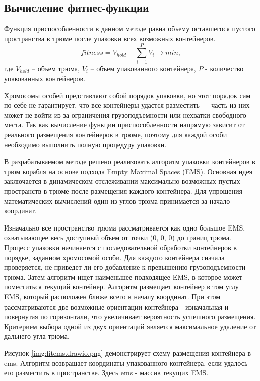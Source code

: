 \subsection{Вычисление фитнес-функции}
Функция приспособленности в данном методе равна объему оставшегося пустого пространства в трюме после упаковки всех возможных контейнеров.
    \begin{equation}
	\label{formula:req_fitness}
    fitness = V_{hold} - \sum_{i=1}^P V_{i} \to min,
    \end{equation}
где $V_{hold}$ – объем трюма, $V_{i}$ – объем упакованного контейнера, $P$ - количество упакованных контейнеров. 

Хромосомы особей представляют собой порядок упаковки, но этот порядок сам по себе не гарантирует, что все контейнеры удастся разместить — часть из них может не войти из-за ограничения грузоподъемности или нехватки свободного места. Так как вычисление функции приспособленности напрямую зависит от реального размещения контейнеров в трюме, поэтому для каждой особи необходимо выполнить полную процедуру упаковки.

В разрабатываемом методе решено реализовать алгоритм упаковки контейнеров в трюм корабля на основе подхода Empty Maximal Spaces (EMS). Основная идея заключается в динамическом отслеживании максимально возможных пустых пространств в трюме после размещения каждого контейнера. Для упрощения математических вычислений один из углов трюма принимается за начало координат.

Изначально все пространство трюма рассматривается как одно большое EMS, охватывающее весь доступный объем от точки (0, 0, 0) до границ трюма.
Процесс упаковки начинается с последовательной обработки контейнеров в порядке, заданном хромосомой особи. Для каждого контейнера сначала проверяется, не приведет ли его добавление к превышению грузоподъемности трюма. Затем алгоритм ищет наименьшее подходящее EMS, в которое может поместиться текущий контейнер. Алгоритм размещает контейнер в том углу EMS, который расположен ближе всего к началу координат. При этом рассматриваются две возможные ориентации контейнера - изначальная и повернутая по горизонтали, что увеличивает вероятность успешного размещения. Критерием выбора одной из двух ориентаций является максимальное удаление от дальнего угла трюма.


Рисунок \ref{img:fitems.drawio.png} демонстрирует схему размещения контейнера в ems. Алгоритм возвращает координаты упакованного контейнера, если удалось его разместить в пространстве. Здесь ems - массив текущих EMS.



